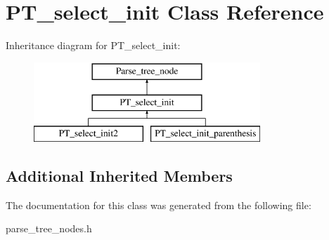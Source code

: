 \hypertarget{classPT__select__init}{}\section{P\+T\+\_\+select\+\_\+init Class Reference}
\label{classPT__select__init}
Inheritance diagram for P\+T\+\_\+select\+\_\+init\+:\begin{figure}[H]
\begin{center}
\leavevmode
\includegraphics[height=3.000000cm]{classPT__select__init}
\end{center}
\end{figure}
\subsection*{Additional Inherited Members}


The documentation for this class was generated from the following file\+:\begin{DoxyCompactItemize}
\item 
parse\+\_\+tree\+\_\+nodes.\+h\end{DoxyCompactItemize}
